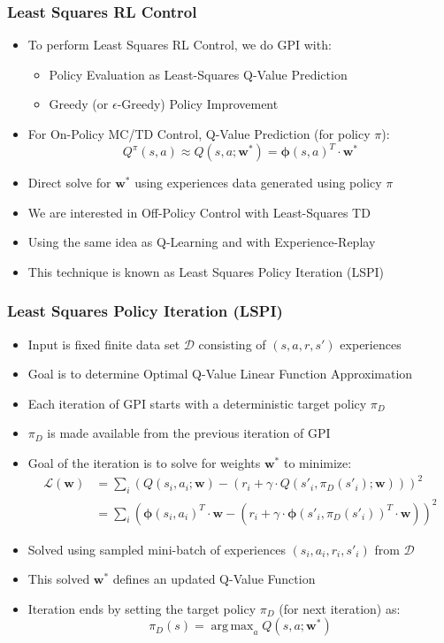 \documentclass[handout]{beamer}
\DeclareMathOperator*{\argmax}{arg\,max}
\begin{document}
\begin{frame}
\frametitle{Least Squares RL Control}
\pause
\begin{itemize}[<+->]
\item To perform Least Squares RL Control, we do GPI with:
\begin{itemize}[<+->]
\item Policy Evaluation as Least-Squares Q-Value Prediction
\item Greedy (or $\epsilon$-Greedy) Policy Improvement
\end{itemize}
\item For On-Policy MC/TD Control, Q-Value Prediction (for policy $\pi$):
$$Q^{\pi}(s,a) \approx Q(s,a;\bm{w}^*) = \bm{\phi}(s,a)^T \cdot \bm{w}^*$$
\item Direct solve for $\bm{w}^*$ using experiences data generated using policy $\pi$
\item We are interested in Off-Policy Control with Least-Squares TD
\item Using the same idea as Q-Learning and with Experience-Replay
\item This technique is known as Least Squares Policy Iteration (LSPI)
\end{itemize}
\end{frame}

\begin{frame}
\frametitle{Least Squares Policy Iteration (LSPI)}
\pause
\begin{itemize}[<+->]
\item Input is fixed finite data set $\mathcal{D}$ consisting of $(s,a,r,s')$ experiences
\item Goal is to determine Optimal Q-Value Linear Function Approximation
\item Each iteration of GPI starts with a deterministic target policy $\pi_D$
\item $\pi_D$ is made available from the previous iteration of GPI
\item Goal of the iteration is to solve for weights $\bm{w}^*$ to minimize:
\begin{align*}
\mathcal{L}(\bm{w}) & = \sum_i (Q(s_i,a_i; \bm{w}) - (r_i + \gamma \cdot Q(s'_i,\pi_D(s'_i); \bm{w})))^2\\
& = \sum_i (\bm{\phi}(s_i,a_i)^T \cdot \bm{w} - (r_i + \gamma \cdot \bm{\phi}(s'_i, \pi_D(s'_i))^T \cdot \bm{w}))^2
\end{align*}
\item Solved using sampled mini-batch of experiences $(s_i,a_i,r_i,s'_i)$ from $\mathcal{D}$
\item This solved $\bm{w}^*$ defines an updated Q-Value Function
\item Iteration ends by setting the target policy $\pi_D$ (for next iteration) as:
$$\pi_D(s) = \argmax_a Q(s,a; \bm{w}^*)$$
\end{itemize}
\end{frame}
\end{document}
